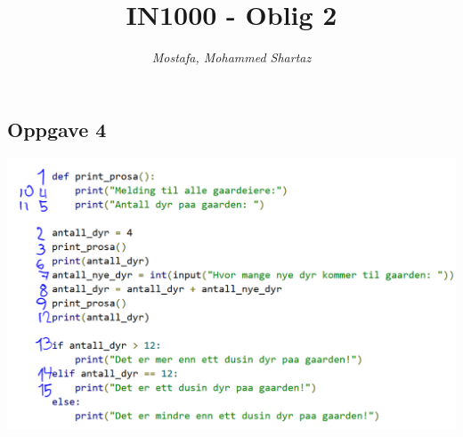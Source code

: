 \documentclass[11pt]{article}
\title{IN1000 - Oblig 2}
\author{\textit{Mostafa, Mohammed Shartaz}}
\begin{document}
\maketitle
\newpage
\subsection*{Oppgave 4}
\includegraphics[scale=0.7]{kodeflyt.png}
\end{document}
